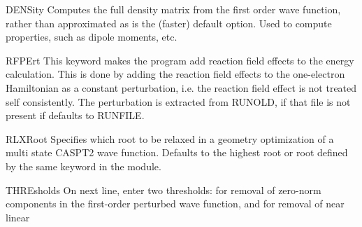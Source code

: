 \begin{keywordlist}
\item[DENSity]
Computes the full density matrix from the first order wave function,
rather than approximated as is the (faster) default option. Used to
compute  properties, such as dipole moments, etc.
\item[RFPErt]
This keyword makes the program add reaction field effects to the energy
calculation. This is done by adding the reaction field effects to the
one-electron Hamiltonian as a constant perturbation, i.e. the reaction field
effect is not treated self consistently. The perturbation is extracted from RUNOLD,
if that file is not present if defaults to RUNFILE.
\item[RLXRoot]
Specifies which root to be relaxed in a geometry optimization of a
multi state CASPT2 wave function. Defaults to the highest root or
root defined by the same keyword in the  module.
\item[THREsholds]
On next line, enter two
thresholds: for removal of zero-{}norm components in the
first-{}order perturbed wave function, and for removal of near linear

\end{keywordlist}
